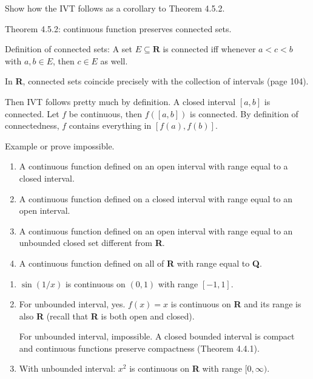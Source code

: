 \documentclass{oxmathproblems}
\begin{document}
\begin{questions}

\miquestion Show how the IVT follows as a corollary to Theorem 4.5.2.
\begin{solution}
  Theorem 4.5.2: continuous function preserves connected sets.

  Definition of connected sets: A set $E \subseteq \textbf{R}$ is connected iff whenever $a < c < b$ with $a, b \in E$, then $c \in E$ as well.

  In \textbf{R}, connected sets coincide precisely with the collection of intervals (page 104).
  
  Then IVT follows pretty much by definition. A closed interval $[a, b]$ is connected. Let $f$ be continuous, then $f([a, b])$ is connected. By definition of connectedness,
  $f$ contains everything in $[f(a), f(b)]$.
\end{solution}

\miquestion Example or prove impossible.
\begin{enumerate}[label=(\alph*)]
  \item A continuous function defined on an open interval with range equal to a closed interval.
  \item A continuous function defined on a closed interval with range equal to an open interval.
  \item A continuous function defined on an open interval with range equal to an unbounded closed set different from \textbf{R}.
  \item A continuous function defined on all of \textbf{R} with range equal to \textbf{Q}.
\end{enumerate}

\begin{solution}
  \begin{enumerate}[label=(\alph*)]
    \item $\sin(1/x)$ is continuous on $(0, 1)$ with range $[-1, 1]$.
    \item For unbounded interval, yes. $f(x)=x$ is continuous on \textbf{R} and its range is also \textbf{R} (recall that \textbf{R} is both open and closed).
    
    For unbounded interval, impossible. A closed bounded interval is compact and continuous functions preserve compactness (Theorem 4.4.1).
    \item With unbounded interval: $x^2$ is continuous on \textbf{R} with range $[0, \infty)$.
    

\end{enumerate}
\end{solution}
\end{questions}
\end{document}

